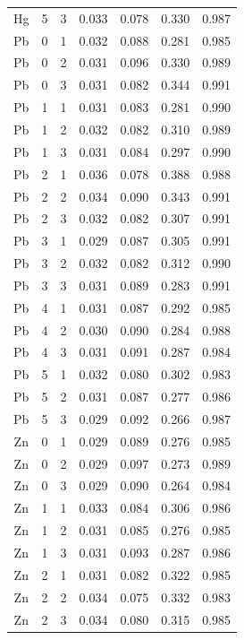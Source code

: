 \documentclass[ms, hidelinks]{uncgdissertationexp3}
\theoremstyle{plain}
\theoremstyle{definition}
\theoremstyle{remark}
\begin{document}
\begin{longtable}{ccccccc}
  Hg & 5 & 3 & 0.033 & 0.078 & 0.330 & 0.987\\
  \rowcolor{gray!6}  Pb & 0 & 1 & 0.032 & 0.088 & 0.281 & 0.985\\
  Pb & 0 & 2 & 0.031 & 0.096 & 0.330 & 0.989\\
  \rowcolor{gray!6}  Pb & 0 & 3 & 0.031 & 0.082 & 0.344 & 0.991\\
  Pb & 1 & 1 & 0.031 & 0.083 & 0.281 & 0.990\\
  \rowcolor{gray!6}  Pb & 1 & 2 & 0.032 & 0.082 & 0.310 & 0.989\\
  Pb & 1 & 3 & 0.031 & 0.084 & 0.297 & 0.990\\
  \rowcolor{gray!6}  Pb & 2 & 1 & 0.036 & 0.078 & 0.388 & 0.988\\
  Pb & 2 & 2 & 0.034 & 0.090 & 0.343 & 0.991\\
  \rowcolor{gray!6}  Pb & 2 & 3 & 0.032 & 0.082 & 0.307 & 0.991\\
  Pb & 3 & 1 & 0.029 & 0.087 & 0.305 & 0.991\\
  \rowcolor{gray!6}  Pb & 3 & 2 & 0.032 & 0.082 & 0.312 & 0.990\\
  Pb & 3 & 3 & 0.031 & 0.089 & 0.283 & 0.991\\
  \rowcolor{gray!6}  Pb & 4 & 1 & 0.031 & 0.087 & 0.292 & 0.985\\
  Pb & 4 & 2 & 0.030 & 0.090 & 0.284 & 0.988\\
  \rowcolor{gray!6}  Pb & 4 & 3 & 0.031 & 0.091 & 0.287 & 0.984\\
  Pb & 5 & 1 & 0.032 & 0.080 & 0.302 & 0.983\\
  \rowcolor{gray!6}  Pb & 5 & 2 & 0.031 & 0.087 & 0.277 & 0.986\\
  Pb & 5 & 3 & 0.029 & 0.092 & 0.266 & 0.987\\
  \rowcolor{gray!6}  Zn & 0 & 1 & 0.029 & 0.089 & 0.276 & 0.985\\
  Zn & 0 & 2 & 0.029 & 0.097 & 0.273 & 0.989\\
  \rowcolor{gray!6}  Zn & 0 & 3 & 0.029 & 0.090 & 0.264 & 0.984\\
  Zn & 1 & 1 & 0.033 & 0.084 & 0.306 & 0.986\\
  \rowcolor{gray!6}  Zn & 1 & 2 & 0.031 & 0.085 & 0.276 & 0.985\\
  Zn & 1 & 3 & 0.031 & 0.093 & 0.287 & 0.986\\
  \rowcolor{gray!6}  Zn & 2 & 1 & 0.031 & 0.082 & 0.322 & 0.985\\
  Zn & 2 & 2 & 0.034 & 0.075 & 0.332 & 0.983\\
  \rowcolor{gray!6}  Zn & 2 & 3 & 0.034 & 0.080 & 0.315 & 0.985\\

\end{longtable}
\end{document}
